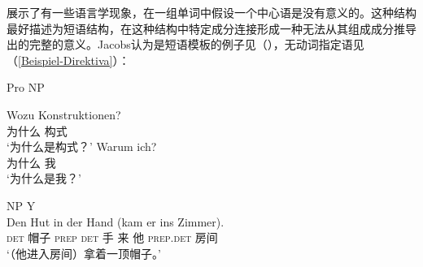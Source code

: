 \begin{exe}
\begin{xlist}[iv.]
\begin{exe}
\begin{xlist}[iv.]
\citet{Jacobs2008a}展示了有一些语言学现象，在一组单词中假设一个中心语是没有意义的。这种结构最好描述为短语结构，在这种结构中特定成分连接形成一种无法从其组成成分推导出的完整的意义。Jacobs认为是短语模板的例子见（），无动词指定语见（\ref{Beispiel-Direktiva}）：
\begin{exe}
\ex Pro NP
\begin{xlist}
\ex
\gll  Wozu Konstruktionen?\\
      为什么 构式\\
\glt `为什么是构式？'
\ex 
\gll Warum ich?\\
     为什么 我\\
\glt `为什么是我？'
\end{xlist}
\end{exe}
\ea
NP Y\\
\gll Den Hut in der Hand (kam er ins Zimmer).\\
     \textsc{det} 帽子 \textsc{prep} \textsc{det} 手 来 他 \textsc{prep}.\textsc{det} 房间\\
\glt `（他进入房间）拿着一顶帽子。'


\end{xlist}
\end{exe}
\end{xlist}
\end{exe}
